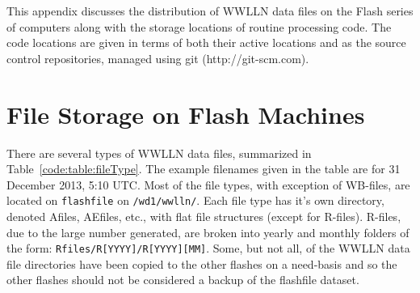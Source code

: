 This appendix discusses the distribution of WWLLN data files on the Flash series of computers along with the storage locations of routine processing code.
The code locations are given in terms of both their active locations and as the source control repositories, managed using git (http://git-scm.com).

\section{File Storage on Flash Machines}

There are several types of WWLLN data files, summarized in Table~\ref{code:table:fileType}.
The example filenames given in the table are for 31 December 2013, 5:10 UTC.
Most of the file types, with exception of WB-files, are located on \texttt{flashfile} on \texttt{/wd1/wwlln/}.
Each file type has it's own directory, denoted Afiles, AEfiles, etc., with flat file structures (except for R-files).
R-files, due to the large number generated, are broken into yearly and monthly folders of the form: \texttt{Rfiles/R[YYYY]/R[YYYY][MM]}.
Some, but not all, of the WWLLN data file directories have been copied to the other flashes on a need-basis and so the other flashes should not be considered a backup of the flashfile dataset.

